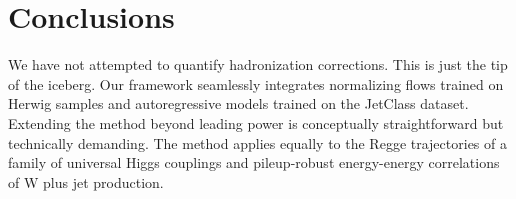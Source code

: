 \section{Conclusions}\label{sec:conclusions}

We have not attempted to quantify hadronization corrections. This is
just the tip of the iceberg. Our framework seamlessly integrates
normalizing flows trained on Herwig samples and autoregressive models
trained on the JetClass dataset. Extending the method beyond leading
power is conceptually straightforward but technically demanding. The
method applies equally to the Regge trajectories of a family of
universal Higgs couplings and pileup-robust energy-energy correlations
of W plus jet production.


